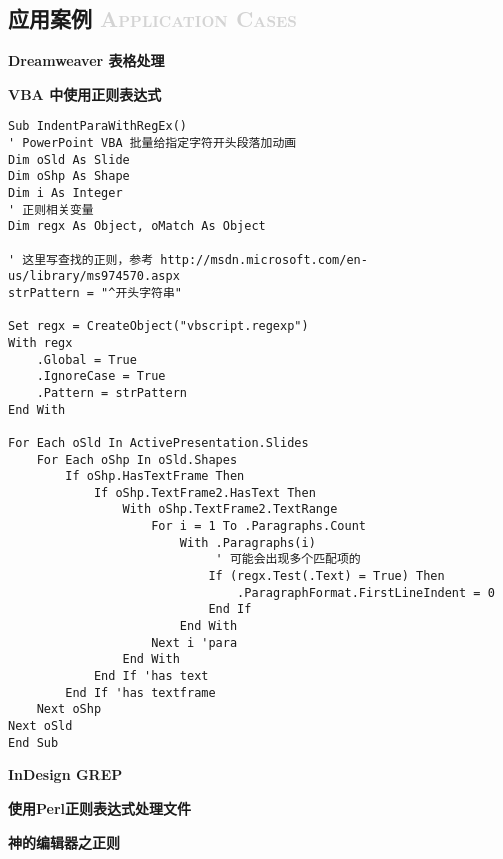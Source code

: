 \documentclass[12pt,a4paper,twoside]{ctexart}
\begin{document}
\subsection[应用案例]{应用案例 \textcolor{lightgray}{\textsc{Application Cases}}}
\label{sec:cases}

\noindent\textbf{Dreamweaver 表格处理} \par

\noindent\textbf{VBA 中使用正则表达式} \par

\begin{lstlisting}[language=VBScript]
Sub IndentParaWithRegEx()
' PowerPoint VBA 批量给指定字符开头段落加动画
Dim oSld As Slide
Dim oShp As Shape
Dim i As Integer
' 正则相关变量
Dim regx As Object, oMatch As Object

' 这里写查找的正则，参考 http://msdn.microsoft.com/en-us/library/ms974570.aspx
strPattern = "^开头字符串"

Set regx = CreateObject("vbscript.regexp")
With regx
    .Global = True
    .IgnoreCase = True
    .Pattern = strPattern
End With
    
For Each oSld In ActivePresentation.Slides
    For Each oShp In oSld.Shapes
        If oShp.HasTextFrame Then
            If oShp.TextFrame2.HasText Then
                With oShp.TextFrame2.TextRange
                    For i = 1 To .Paragraphs.Count
                        With .Paragraphs(i)
                             ' 可能会出现多个匹配项的
                            If (regx.Test(.Text) = True) Then
                                .ParagraphFormat.FirstLineIndent = 0
                            End If
                        End With
                    Next i 'para
                End With
            End If 'has text
        End If 'has textframe
    Next oShp
Next oSld
End Sub  
\end{lstlisting}

\noindent\textbf{InDesign GREP} \par

\noindent\textbf{使用Perl正则表达式处理文件} \par

\noindent\textbf{神的编辑器之正则} \par
\end{document}

